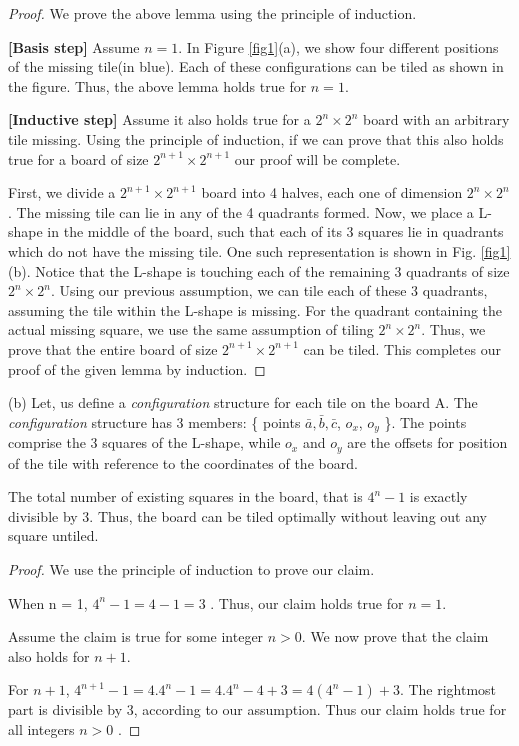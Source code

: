 \documentclass[assign]{article}
\begin{document}
\vspace{-10pt}

\begin{proof} We prove  the above lemma using the principle of induction.

  {\bf [Basis step]} Assume $n=1$. In Figure \ref{fig1}(a),  we show four different positions of the missing tile(in blue). Each of these configurations can be tiled as shown in the figure. Thus, the above lemma holds true for $n=1$.

  {\bf [Inductive step]} Assume it also holds true for a $2^n \times 2^n$ board with an arbitrary tile missing. Using the principle of induction, if we can prove that this also holds true for a board of size $2^{n+1} \times 2^{n+1}$ our proof will be complete. 

\noindent First, we divide a $2^{n+1} \times 2^{n+1}$ board into 4 halves, each one of dimension $2^n \times 2^n$. The missing tile can lie in any of the 4 quadrants formed. Now, we place a L-shape in the middle of the board, such that each of its 3 squares lie in quadrants which do not have the missing tile. One such representation is shown in Fig. \ref{fig1}(b). Notice that the L-shape is touching each of the remaining 3 quadrants of size $2^n \times 2^n$. Using our previous assumption, we can tile each of these 3 quadrants, assuming the tile within the L-shape is missing. For the quadrant containing the actual missing square, we use the same assumption of tiling $2^n \times 2^n$. Thus, we prove that the entire board of size $2^{n+1} \times 2^{n+1}$ can be tiled. This completes our proof of the given lemma by induction.
\end{proof}

\noindent (b)  
\noindent Let, us define a {\em configuration} structure for each tile on the board A. The {\em configuration} structure has 3 members: \{ points $\bar{a},\bar{b},\bar{c}$, $o_x$, $o_y$ \}. The points comprise the 3 squares of the L-shape, while $o_x$ and $o_y$ are the offsets for position of the tile with reference to the coordinates of the board. 

 The total number of existing squares in the board, that is $4^n-1$ is exactly divisible by 3. Thus, the board can be tiled optimally without leaving out any square untiled. 

\begin{proof}
   We use the principle of induction to prove our claim.

 When n = 1, $4^n-1 = 4 - 1 = 3$ . Thus, our claim holds true for $n=1$.

 Assume the claim is true for some integer $n > 0$. We now prove that the claim also holds for $n+1$. 

\noindent For $n+1$, $4^{n+1} - 1 = 4.4^n-1 = 4.4^n - 4 + 3 = 4(4^n-1) + 3$. The rightmost part is divisible by 3, according to our assumption. Thus our claim holds true for all integers $n > 0$ .
\end{proof}
\end{document}
